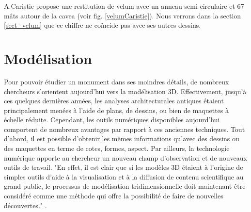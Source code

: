 		A.Caristie propose une restitution de \gls{velum} avec un anneau semi-circulaire et 67 mâts autour de la \gls{cavea} (voir fig. \ref{velumCaristie}). Nous verrons dans la section \ref{sect_velum} que ce chiffre ne coïncide pas avec ses autres dessins.
		














\chapter{Modélisation}
		\minitoc
		\newpage
		
		Pour pouvoir étudier un monument dans ses moindres détails, de nombreux chercheurs s'orientent aujourd'hui vers la modélisation 3D. Effectivement, jusqu'à ces quelques dernières années, les analyses architecturales antiques étaient principalement menées à l'aide de plans, de dessins, ou bien de maquettes à échelle réduite. Cependant, les outils numériques disponibles aujourd'hui comportent de nombreux avantages par rapport à ces anciennes techniques. Tout d'abord, il est possible d'obtenir les mêmes informations qu'avec des dessins ou des maquettes en terme de cotes, formes, aspect. Par ailleurs, la technologie numérique apporte au chercheur un nouveau champ d'observation et de nouveaux outils de travail. "En effet, il est clair que si les modèles 3D étaient à l’origine de simples outils d’aide à la visualisation et à la diffusion de contenu scientifique au grand public, le processus de modélisation tridimensionnelle doit maintenant être considéré comme une méthode qui offre la possibilité de faire de nouvelles découvertes." \cite[p. 246]{rocheleau}.
		
